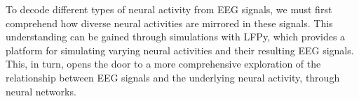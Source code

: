\documentclass[a4paper, UKenglish, 11pt]{uiomaster}
\begin{document}
To decode different types of neural activity from EEG signals, we must first comprehend how diverse neural activities are mirrored in these signals. This understanding can be gained through simulations with LFPy, which provides a platform for simulating varying neural activities and their resulting EEG signals. This, in turn, opens the door to a more comprehensive exploration of the relationship between EEG signals and the underlying neural activity, through neural networks.








\end{document}
